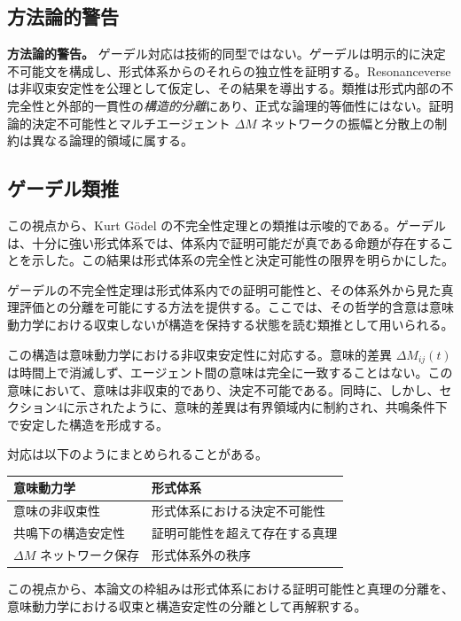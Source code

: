 \documentclass[11pt,a4paper]{article}
\theoremstyle{definition}
\begin{document}
\subsection{方法論的警告}

\textbf{方法論的警告。} ゲーデル対応は技術的同型ではない。ゲーデルは明示的に決定不可能文を構成し、形式体系からのそれらの独立性を証明する。Resonanceverse は非収束安定性を公理として仮定し、その結果を導出する。類推は形式内部の不完全性と外部的一貫性の\textit{構造的分離}にあり、正式な論理的等価性にはない。証明論的決定不可能性とマルチエージェント $\Delta M$ ネットワークの振幅と分散上の制約は異なる論理的領域に属する。

\subsection{ゲーデル類推}

この視点から、Kurt Gödel の不完全性定理との類推は示唆的である。ゲーデルは、十分に強い形式体系では、体系内で証明可能だが真である命題が存在することを示した。この結果は形式体系の完全性と決定可能性の限界を明らかにした。

ゲーデルの不完全性定理は形式体系内での証明可能性と、その体系外から見た真理評価との分離を可能にする方法を提供する。ここでは、その哲学的含意は意味動力学における収束しないが構造を保持する状態を読む類推として用いられる。

この構造は意味動力学における非収束安定性に対応する。意味的差異 $\Delta M_{ij}(t)$ は時間上で消滅しず、エージェント間の意味は完全に一致することはない。この意味において、意味は非収束的であり、決定不可能である。同時に、しかし、セクション4に示されたように、意味的差異は有界領域内に制約され、共鳴条件下で安定した構造を形成する。

対応は以下のようにまとめられることがある。

\begin{table}[h]
\centering
\begin{tabular}{ll}
\hline
\textbf{意味動力学} & \textbf{形式体系} \\
\hline
意味の非収束性 & 形式体系における決定不可能性 \\
共鳴下の構造安定性 & 証明可能性を超えて存在する真理 \\
$\Delta M$ ネットワーク保存 & 形式体系外の秩序 \\
\hline
\end{tabular}
\end{table}

この視点から、本論文の枠組みは形式体系における証明可能性と真理の分離を、意味動力学における収束と構造安定性の分離として再解釈する。
\end{document}
